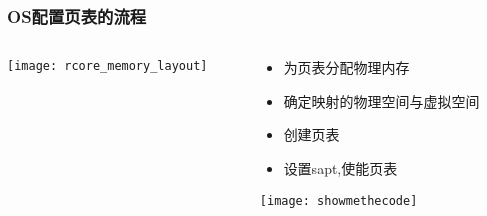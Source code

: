 \begin{frame} 
	\frametitle{OS配置页表的流程}
	
	\begin{columns}
		
		\begin{column}{.4\textwidth}
			\texttt{[image: rcore\_memory\_layout]}
			
		\end{column}
		
		
		\begin{column}{.6\textwidth}
			
			\begin{itemize}
			\item 为页表分配物理内存 
			\item 确定映射的物理空间与虚拟空间
			\item 创建页表
			\item 设置sapt,使能页表 \pause
		
			\end{itemize}
			\texttt{[image: showmethecode]}
		\end{column}
		
		
	\end{columns}
\end{frame}


